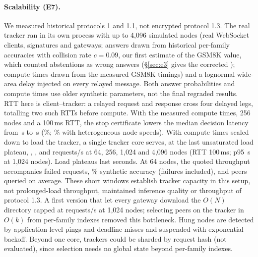 \documentclass[11pt]{article}
\theoremstyle{definition}
\theoremstyle{remark}
\begin{document}
\paragraph{Scalability (E7).} We measured historical protocols 1 and 1.1, not encrypted protocol 1.3.
The real tracker ran in its own process with up to 4{,}096 simulated nodes
(real WebSocket clients, signatures and gateways; answers drawn from historical per-family accuracies
with collision rate $c=0.09$, our first estimate of the GSM8K value, which counted abstentions as wrong
answers (\S\ref{sec:e3} gives the corrected \eThreeCollision); compute times drawn from the measured GSM8K timings) and a lognormal
wide-area delay injected on every relayed message. Both answer probabilities and compute times use older
synthetic parameters, not the final regraded results. RTT here is client--tracker: a relayed request and
response cross four delayed legs, totalling two such RTTs before compute. With the measured compute times, 256 nodes and
a
100\,ms RTT, the stop certificate lowers the median decision latency from \eSevenCertWaitAll{}\,s to
\eSevenCertCert{}\,s (\eSevenCertGain\%; \eSevenCertGainHetero\% with heterogeneous node speeds). With
compute times scaled down to load the tracker, a single tracker core serves, at the last unsaturated load plateau,
\eSevenRpsSixtyFour{}, \eSevenRpsTwoFiftySix{}, \eSevenRpsOneK{} and \eSevenRpsFourK{} requests/s at
64, 256, 1{,}024 and 4{,}096 nodes (RTT 100\,ms; p95 \eSevenPninetyfiveOneK\,s at 1{,}024 nodes).
Load plateaus last \eSevenStageSeconds{} seconds. At 64 nodes, the quoted throughput accompanies
\eSevenFailedSixtyFour{} failed requests, \eSevenAccuracySixtyFour\% synthetic accuracy (failures included),
and \eSevenAskedSixtyFour{} peers queried on average. These short windows establish tracker capacity
in this setup, not prolonged-load throughput, maintained inference quality or throughput of protocol 1.3.
A first version that let every gateway download the $O(N)$ directory capped at \eSevenRpsBeforeOneK{} requests/s at
1{,}024 nodes; selecting peers on the tracker in $O(k)$ from per-family indexes removed this bottleneck.
Hung nodes are detected by application-level pings and deadline misses and suspended with exponential
backoff. Beyond one core, trackers could be sharded by request hash (not evaluated), since selection needs no global state
beyond per-family indexes.
\end{document}
